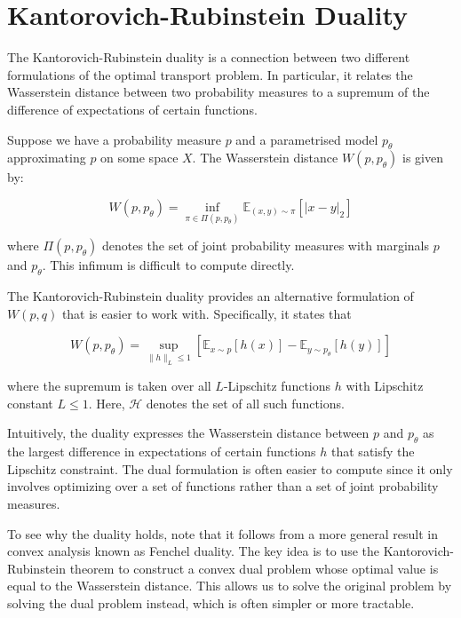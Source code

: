 

\section{Kantorovich-Rubinstein Duality}

The Kantorovich-Rubinstein duality is a connection between two different formulations of the optimal transport problem. In particular, it relates the Wasserstein distance between two probability measures to a supremum of the difference of expectations of certain functions.

Suppose we have a probability measure $p$ and a parametrised model $p_\theta$ approximating $p$ on some space $X$. The Wasserstein distance $W(p, p_\theta)$ is given by:

$$W(p, p_\theta) = \inf_{\pi \in \Pi(p, p_\theta)} \mathbb{E}_{(x, y) \sim \pi} [|x - y|_2]$$

where $\Pi(p, p_\theta)$ denotes the set of joint probability measures with marginals $p$ and $p_\theta$. This infimum is difficult to compute directly.

The Kantorovich-Rubinstein duality provides an alternative formulation of $W(p, q)$ that is easier to work with. Specifically, it states that

$$W(p, p_\theta) = \sup_{\|h\|_L \leq 1} \left[\mathbb{E}_{x \sim p}[h(x)] - \mathbb{E}_{y \sim p_\theta}[h(y)]\right]$$

where the supremum is taken over all $L$-Lipschitz functions $h$ with Lipschitz constant $L \leq 1$. Here, $\mathcal{H}$ denotes the set of all such functions.

Intuitively, the duality expresses the Wasserstein distance between $p$ and $p_\theta$ as the largest difference in expectations of certain functions $h$ that satisfy the Lipschitz constraint. The dual formulation is often easier to compute since it only involves optimizing over a set of functions rather than a set of joint probability measures.

To see why the duality holds, note that it follows from a more general result in convex analysis known as Fenchel duality. The key idea is to use the Kantorovich-Rubinstein theorem to construct a convex dual problem whose optimal value is equal to the Wasserstein distance. This allows us to solve the original problem by solving the dual problem instead, which is often simpler or more tractable.